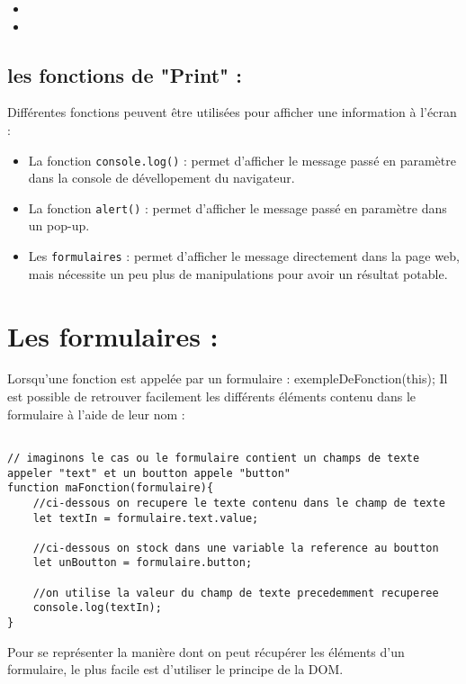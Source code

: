 \documentclass[a4paper, 11pt]{scrartcl}
\begin{document}
\begin{itemize}
\item 
\item
\end{itemize}


\subsection{les fonctions de "Print" :}

Différentes fonctions peuvent être utilisées pour afficher une information à l'écran :
\begin{itemize}
\item La fonction \texttt{console.log()} : permet d'afficher le message passé en paramètre dans la console de dévellopement du navigateur.
\item La fonction \texttt{alert()} : permet d'afficher le message passé en paramètre dans un pop-up.
\item Les \texttt{formulaires} : permet d'afficher le message directement dans la page web, mais nécessite un peu plus de manipulations pour avoir un résultat potable.
\end{itemize}

\section{Les formulaires :}

Lorsqu'une fonction est appelée par un formulaire : exempleDeFonction(this); Il est possible de retrouver facilement les différents éléments contenu dans le formulaire à l'aide de leur nom :

\begin{lstlisting}

// imaginons le cas ou le formulaire contient un champs de texte appeler "text" et un boutton appele "button"
function maFonction(formulaire){
	//ci-dessous on recupere le texte contenu dans le champ de texte
	let textIn = formulaire.text.value;
	
	//ci-dessous on stock dans une variable la reference au boutton 
	let unBoutton = formulaire.button;
	
	//on utilise la valeur du champ de texte precedemment recuperee
	console.log(textIn);
}

\end{lstlisting}

Pour se représenter la manière dont on peut récupérer les éléments d'un formulaire, le plus facile est d'utiliser le principe de la DOM.
\end{document}
